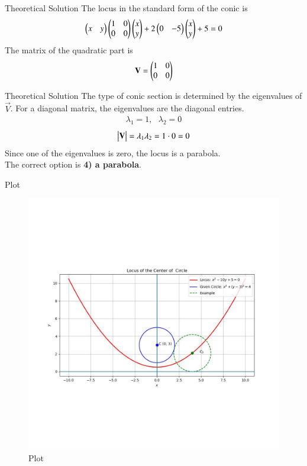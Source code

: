 \documentclass{beamer}
\begin{document}
\begin{frame}{Theoretical Solution}
The locus in the standard form of the conic is
\begin{align}
    \begin{pmatrix}x & y\end{pmatrix}\begin{pmatrix}1 & 0 \\ 0 & 0\end{pmatrix}\begin{pmatrix}x \\ y\end{pmatrix} + 2\begin{pmatrix}0 & -5\end{pmatrix}\begin{pmatrix}x \\ y\end{pmatrix} + 5 = 0
\end{align}
The matrix of the quadratic part is
\begin{align}
    \mathbf{V} = \begin{pmatrix}1 & 0 \\ 0 & 0\end{pmatrix}
\end{align}
\end{frame}

\begin{frame}{Theoretical Solution}
The type of conic section is determined by the eigenvalues of $\vec{V}$. For a diagonal matrix, the eigenvalues are the diagonal entries.
\begin{align}
    \lambda_1 = 1, \text{ } \lambda_2 = 0
\end{align}
\begin{align}
    \begin{vmatrix}\mathbf{V}\end{vmatrix} = \lambda_1\lambda_2 = 1 \cdot 0 = 0
\end{align}
Since one of the eigenvalues is zero, the locus is a parabola. \\
The correct option is \textbf{4) a parabola}.
\end{frame}

\begin{frame}{Plot}
\begin{figure}
	\centering
	\includegraphics[width=0.5\columnwidth]{../figs/plot_c.jpg}
	\caption{Plot}
	\label{fig:fig}
\end{figure}
\end{frame}
\end{document}
